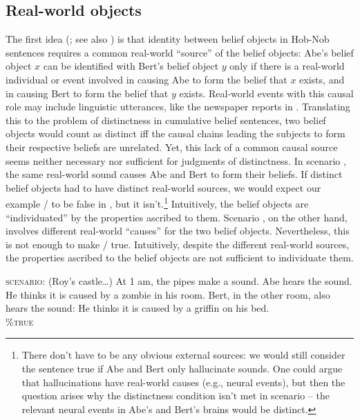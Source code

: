 \documentclass[output=paper]{langscibook}
\begin{document}
\subsection{Real-world objects}\label{sch-has:sec:4.1}

The first idea (\citealt{Rooy:1997,Dekker:1998}; see also \citealt{Cumming:2007}) is that identity between belief objects in Hob-Nob sentences requires a common real-world ``source'' of the belief objects: Abe's belief object $x$ can be identified with Bert's belief object $y$ only if there is a real-world individual or event  involved in causing Abe to form the belief that $x$ exists, and in causing Bert to form the belief that $y$ exists. Real-world events with this causal role may include linguistic utterances, like the newspaper reports in . Translating this to the problem of distinctness in cumulative belief sentences, two belief objects would count as distinct iff the causal chains leading the subjects to form their respective beliefs are unrelated. Yet,  this lack of a common causal source seems neither necessary nor sufficient for judgments of distinctness. In scenario , the same real-world sound causes Abe and Bert to form their beliefs. If distinct belief objects had to have distinct real-world sources,  we would expect our example / to be false in , but it isn't.\footnote{There don't have to be any obvious external sources: we would still consider the sentence true if Abe and Bert only hallucinate sounds. One could argue that hallucinations have  real-world causes (e.g., neural events), but then the question arises why the distinctness condition isn't met in scenario  -- the relevant neural events in Abe's and Bert's brains would be distinct.} Intuitively, the belief objects are ``individuated'' by the properties ascribed to them. Scenario , on the other hand, involves different real-world ``causes'' for the two belief objects. Nevertheless, this is not enough to make / true. Intuitively, despite the different real-world sources, the properties ascribed to the belief objects are not sufficient to individuate them.

\eanoraggedright \label{sch-has:ex:50} \textsc{scenario:} (Roy's castle\ldots) At 1 am, the pipes make a sound. Abe hears the sound. He thinks  it is caused by a zombie in his room. Bert, in the other room, also hears the sound: He thinks it is caused by a griffin on his bed. \\\null\hfill  {} \textsc{\%true}\z
\end{document}
